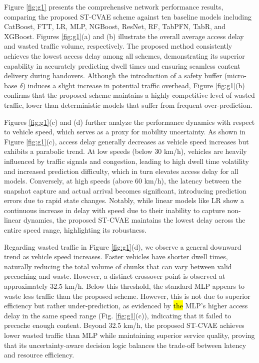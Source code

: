 \documentclass[journal]{IEEEtran}
\begin{document}
Figure \ref{fig:g1} presents the comprehensive network performance results, comparing the proposed ST-CVAE scheme against ten baseline models including CatBoost, FTT, LR, MLP, NGBoost, ResNet, RF, TabPFN, TabR, and XGBoost.
Figures \ref{fig:g1}(a) and (b) illustrate the overall average access delay and wasted traffic volume, respectively.
The proposed method consistently achieves the lowest access delay among all schemes, demonstrating its superior capability in accurately predicting dwell times and ensuring seamless content delivery during handovers.
Although the introduction of a safety buffer (micro-base $\delta$) induces a slight increase in potential traffic overhead, Figure \ref{fig:g1}(b) confirms that the proposed scheme maintains a highly competitive level of wasted traffic, lower than deterministic models that suffer from frequent over-prediction.

Figures \ref{fig:g1}(c) and (d) further analyze the performance dynamics with respect to vehicle speed, which serves as a proxy for mobility uncertainty.
As shown in Figure \ref{fig:g1}(c), access delay generally decreases as vehicle speed increases but exhibits a parabolic trend.
At low speeds (below 30 km/h), vehicles are heavily influenced by traffic signals and congestion, leading to high dwell time volatility and increased prediction difficulty, which in turn elevates access delay for all models.
Conversely, at high speeds (above 60 km/h), the latency between the snapshot capture and actual arrival becomes significant, introducing prediction errors due to rapid state changes.
Notably, while linear models like LR show a continuous increase in delay with speed due to their inability to capture non-linear dynamics, the proposed ST-CVAE maintains the lowest delay across the entire speed range, highlighting its robustness.

Regarding wasted traffic in Figure \ref{fig:g1}(d), we observe a general downward trend as vehicle speed increases.
Faster vehicles have shorter dwell times, naturally reducing the total volume of chunks that can vary between valid precaching and waste.
However, a distinct crossover point is observed at approximately 32.5 km/h.
Below this threshold, the standard MLP appears to waste less traffic than the proposed scheme.
However, this is not due to superior efficiency but rather under-prediction, as evidenced by \hl{the} MLP's higher access delay in the same speed range (Fig. \ref{fig:g1}(c)), indicating that it failed to precache enough content.
Beyond 32.5 km/h, the proposed ST-CVAE achieves lower wasted traffic than MLP while maintaining superior service quality, proving that its uncertainty-aware decision logic balances the trade-off between latency and resource efficiency.
\end{document}
